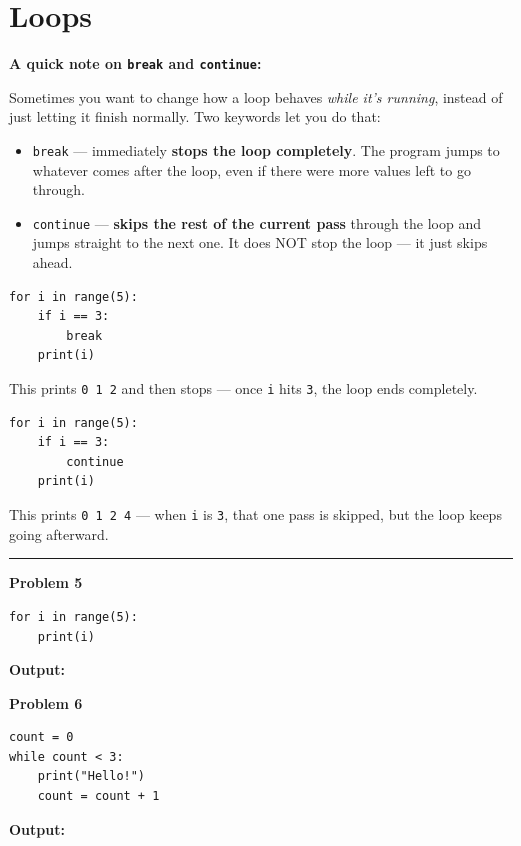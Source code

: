 \documentclass[11pt]{article}
\newcommand{\answerbox}{%
\vspace{2mm}
\noindent\textbf{Output:}
\vspace{14mm}
}
\begin{document}
\newpage
\section{Loops}

\noindent\textbf{A quick note on \texttt{break} and \texttt{continue}:}
\vspace{2mm}

\noindent Sometimes you want to change how a loop behaves \textit{while it's running}, instead of
just letting it finish normally. Two keywords let you do that:

\begin{itemize}[nosep]
    \item \texttt{break} --- immediately \textbf{stops the loop completely}. The program jumps to
    whatever comes after the loop, even if there were more values left to go through.
    \item \texttt{continue} --- \textbf{skips the rest of the current pass} through the loop and
    jumps straight to the next one. It does NOT stop the loop --- it just skips ahead.
\end{itemize}

\begin{lstlisting}
for i in range(5):
    if i == 3:
        break
    print(i)
\end{lstlisting}
\noindent This prints \texttt{0 1 2} and then stops --- once \texttt{i} hits \texttt{3}, the loop
ends completely.

\begin{lstlisting}
for i in range(5):
    if i == 3:
        continue
    print(i)
\end{lstlisting}
\noindent This prints \texttt{0 1 2 4} --- when \texttt{i} is \texttt{3}, that one pass is
skipped, but the loop keeps going afterward.

\vspace{4mm}
\hrule
\vspace{2mm}

\vspace{4mm}
\noindent\textbf{Problem 5}
\begin{lstlisting}
for i in range(5):
    print(i)
\end{lstlisting}
\answerbox

\vspace{4mm}
\noindent\textbf{Problem 6}
\begin{lstlisting}
count = 0
while count < 3:
    print("Hello!")
    count = count + 1
\end{lstlisting}
\answerbox
\end{document}
